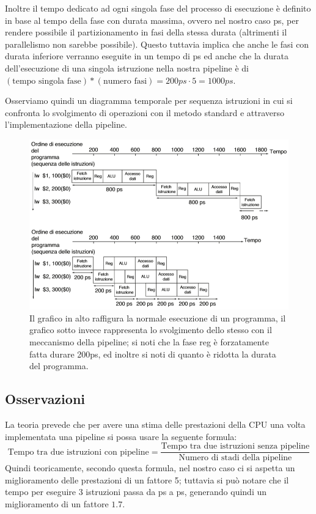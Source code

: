 \documentclass[class=book, crop=false, oneside]{standalone}
\begin{document}
Inoltre il tempo dedicato ad ogni singola fase del processo di esecuzione è definito in base al tempo della fase con durata massima, ovvero nel nostro caso \unit[200]{ps}, per rendere possibile il partizionamento in fasi della stessa durata (altrimenti il parallelismo non sarebbe possibile).
Questo tuttavia implica che anche le fasi con durata inferiore verranno eseguite in un tempo di \unit[200]{ps} ed anche che la durata dell'esecuzione di una singola istruzione nella nostra pipeline è di \((\textrm{tempo singola fase})*(\textrm{numero fasi})=200ps\cdot 5=1000ps\).

Osserviamo quindi un diagramma temporale per sequenza istruzioni in cui si confronta lo svolgimento di operazioni con il metodo standard e attraverso l'implementazione della pipeline.
\begin{figure}[H]
	\centering
	\includegraphics[width=\textwidth,keepaspectratio]{esecuzione-operazioni-confronto.png}
	\caption{Il grafico in alto raffigura la normale esecuzione di un programma, il grafico sotto invece rappresenta lo svolgimento dello stesso con il meccanismo della pipeline; si noti che la fase reg è forzatamente fatta durare 200ps, ed inoltre si noti di quanto è ridotta la durata del programma.}
\end{figure}

\subsection{Osservazioni}
La teoria prevede che per avere una stima delle prestazioni della CPU una volta implementata una pipeline si possa usare la seguente formula:
\begin{equation*}
\text{Tempo tra due istruzioni con pipeline} = \frac{\text{Tempo tra due istruzioni senza pipeline}}{\text{Numero di stadi della pipeline}}
\end{equation*}
Quindi teoricamente, secondo questa formula, nel nostro caso ci si aspetta un miglioramento delle prestazioni di un fattore 5; tuttavia si può notare che il tempo per eseguire 3 istruzioni passa da \unit[2400]{ps} a \unit[1400]{ps}, generando quindi un miglioramento di un fattore \(1.7\).
\end{document}
